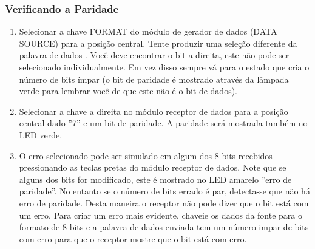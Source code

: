             \subsubsection{Verificando a Paridade}
                \begin{enumerate}
                    \item Selecionar a chave FORMAT do módulo de gerador de dados (DATA SOURCE) para a posição central. Tente produzir uma seleção diferente da palavra de dados . Você deve encontrar o bit a direita, este não pode ser selecionado individualmente. Em vez disso sempre vá para o estado que cria o número de bits ímpar (o bit de paridade é mostrado através da lâmpada verde para lembrar você de que este não é o bit de dados).
                    
                    \item Selecionar a chave a direita no módulo receptor de dados para a posição central dado ''7'' e um bit de paridade. A paridade será mostrada também no LED verde.
                    
                    \item O erro selecionado pode ser simulado em algum dos 8 bits recebidos pressionando as teclas pretas do módulo receptor de dados. Note que se alguns dos bits for modificado, este é mostrado no LED amarelo ''erro de paridade''. No entanto se o número de bits errado é par, detecta-se que não há erro de paridade. Desta maneira o receptor não pode dizer que o bit está com um erro. Para criar um erro mais evidente, chaveie os dados da fonte para o formato de 8 bits e a palavra de dados enviada tem um número impar de bits com erro para que o receptor mostre que o bit está com erro.
                \end{enumerate}
                
                
